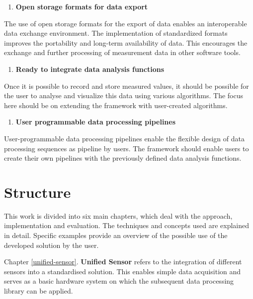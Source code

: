 \begin{enumerate}
\def\labelenumi{\arabic{enumi}.}
\setcounter{enumi}{2}
\tightlist
\item
  \textbf{Open storage formats for data export}
\end{enumerate}

The use of open storage formats for the export of data enables an
interoperable data exchange environment. The implementation of
standardized formats improves the portability and long-term availability
of data. This encourages the exchange and further processing of
measurement data in other software tools.

\begin{enumerate}
\def\labelenumi{\arabic{enumi}.}
\setcounter{enumi}{3}
\tightlist
\item
  \textbf{Ready to integrate data analysis functions}
\end{enumerate}

Once it is possible to record and store measured values, it should be
possible for the user to analyse and visualize this data using various
algorithms. The focus here should be on extending the framework with
user-created algorithms.

\begin{enumerate}
\def\labelenumi{\arabic{enumi}.}
\setcounter{enumi}{4}
\tightlist
\item
  \textbf{User programmable data processing pipelines}
\end{enumerate}

User-programmable data processing pipelines enable the flexible design
of data processing sequences as pipeline by users. The framework should
enable users to create their own pipelines with the previously defined
data analysis functions.

\hypertarget{structure}{%
\section{Structure}\label{structure}}

This work is divided into six main chapters, which deal with the
approach, implementation and evaluation. The techniques and concepts
used are explained in detail. Specific examples provide an overview of
the possible use of the developed solution by the user.

Chapter \ref{unified-sensor}. \textbf{Unified Sensor} refers to the
integration of different sensors into a standardised solution. This
enables simple data acquisition and serves as a basic hardware system on
which the subsequent data processing library can be applied.


